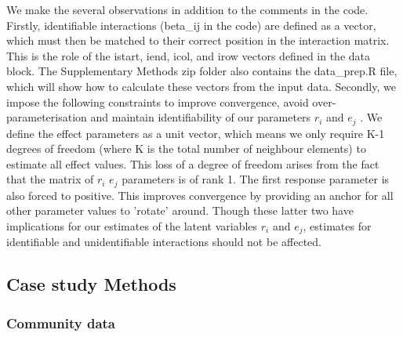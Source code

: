 \documentclass[a4,12pt]{article}
\begin{document}
    We make the several observations in addition to the comments in the code. Firstly, identifiable interactions (beta\_ij in the code) are defined as a vector, which must then be matched to their correct position in the interaction matrix. This is the role of the istart, iend, icol, and irow vectors defined in the data block. The Supplementary Methods zip folder also contains the data\_prep.R file, which will show how to calculate these vectors from the input data. 
    Secondly, we impose the following constraints to improve convergence, avoid over-parameterisation and maintain identifiability of our parameters $r_i$ and $e_j$ \parencite{Huber2004, Kidzinski2020, Niku2021}. We define the effect parameters as a unit vector, which means we only require K-1 degrees of freedom (where K is the total number of neighbour elements) to estimate all effect values. This loss of a degree of freedom arises from the fact that the matrix of $r_i$ $e_j$ parameters is of rank 1. The first response parameter is also forced to positive. This improves convergence by providing an anchor for all other parameter values to 'rotate' around. Though these latter two have implications for our estimates of the latent variables $r_i$ and $e_j$, estimates for identifiable and unidentifiable interactions should not be affected.




    \subsection{Case study Methods}
    \label{SI:casestudy}

        \subsubsection{Community data}
\end{document}
